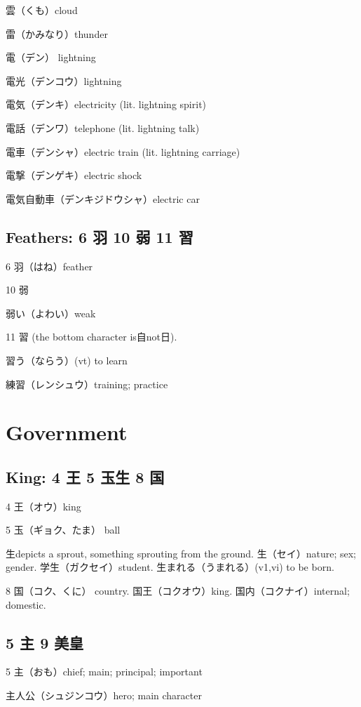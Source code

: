 雲（くも）cloud

雷（かみなり）thunder

電（デン） lightning

電光（デンコウ）lightning

電気（デンキ）electricity (lit. lightning spirit)

電話（デンワ）telephone (lit. lightning talk)

電車（デンシャ）electric train (lit. lightning carriage)

電撃（デンゲキ）electric shock

電気自動車（デンキジドウシャ）electric car

\subsection{Feathers: 6 羽 10 弱 11 習}

6 羽（はね）feather

10 弱

弱い（よわい）weak

11 習 (the bottom character is自not日).

習う（ならう）(vt) to learn

練習（レンシュウ）training; practice

\section{Government}

\subsection{King: 4 王 5 玉生 8 国}

4 王（オウ）king

5 玉（ギョク、たま） ball

生depicts a sprout, something sprouting from the ground.
生（セイ）nature; sex; gender.
学生（ガクセイ）student.
生まれる（うまれる）(v1,vi) to be born.

8 国（コク、くに） country.
国王（コクオウ）king.
国内（コクナイ）internal; domestic.

\subsection{5 主 9 美皇}

5 主（おも）chief; main; principal; important

主人公（シュジンコウ）hero; main character


